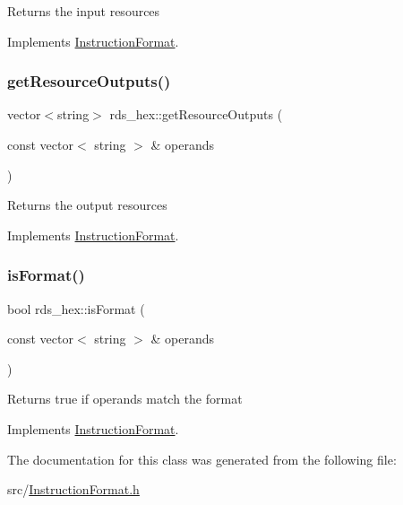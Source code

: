 Returns the input resources 

Implements \hyperlink{classInstructionFormat_a09775d3a3c22f40a0f44504664e586e4}{Instruction\+Format}.

\mbox{\label{classrds__hex_a40821f2b6ed827019708864a90d7ee81}} 
\subsubsection{\texorpdfstring{get\+Resource\+Outputs()}{getResourceOutputs()}}
{\footnotesize\ttfamily vector$<$string$>$ rds\+\_\+hex\+::get\+Resource\+Outputs (\begin{DoxyParamCaption}\item[{const vector$<$ string $>$ \&}]{operands }\end{DoxyParamCaption})\hspace{0.3cm}{\ttfamily [virtual]}}

Returns the output resources 

Implements \hyperlink{classInstructionFormat_a95cd28ffb1bde59b67f676880ab10536}{Instruction\+Format}.

\mbox{\label{classrds__hex_afcf9c40012c4a3d90cc5811cca063244}} 
\subsubsection{\texorpdfstring{is\+Format()}{isFormat()}}
{\footnotesize\ttfamily bool rds\+\_\+hex\+::is\+Format (\begin{DoxyParamCaption}\item[{const vector$<$ string $>$ \&}]{operands }\end{DoxyParamCaption})\hspace{0.3cm}{\ttfamily [virtual]}}

Returns true if operands match the format 

Implements \hyperlink{classInstructionFormat_a9fdcf94dcd7d9a55ba86e7a63f04d1fe}{Instruction\+Format}.



The documentation for this class was generated from the following file\+:\begin{DoxyCompactItemize}
\item 
src/\hyperlink{InstructionFormat_8h}{Instruction\+Format.\+h}\end{DoxyCompactItemize}
